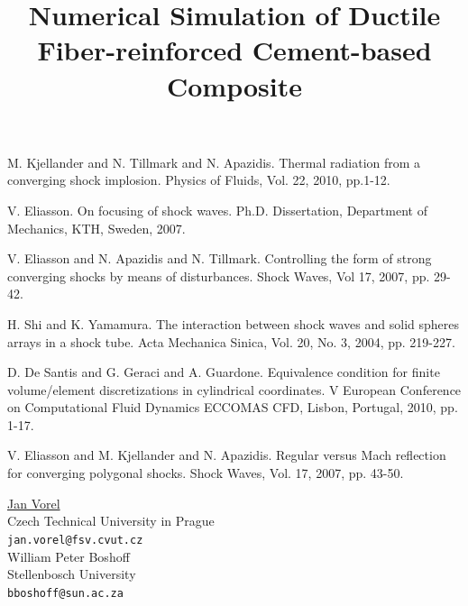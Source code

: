 \documentclass[article,A4,11pt]{llncs}%
\begin{document}

\begin{thebibliography}{10}
{\sc M. Kjellander and N. Tillmark and N. Apazidis}. {Thermal radiation from a converging shock implosion}. Physics of Fluids, Vol. 22, 2010, pp.1-12.

{\sc V. Eliasson}. {On focusing of shock waves}. Ph.D. Dissertation, Department of Mechanics, KTH, Sweden, 2007.

{\sc V. Eliasson and N. Apazidis and N. Tillmark}. {Controlling the form of strong converging shocks by means of disturbances}. Shock Waves, Vol 17, 2007, pp. 29-42.

{\sc H. Shi and K. Yamamura}. {The interaction between shock waves and solid spheres arrays in a shock tube}. Acta Mechanica Sinica, Vol. 20, No. 3, 2004, pp. 219-227.

{\sc D. De Santis and G. Geraci and A. Guardone}. {Equivalence condition for finite volume/element discretizations in cylindrical coordinates}. V European Conference on Computational Fluid Dynamics ECCOMAS CFD, Lisbon, Portugal, 2010, pp. 1-17.

{\sc V. Eliasson and M. Kjellander and N. Apazidis}. {Regular versus Mach reflection for converging polygonal shocks}. Shock Waves, Vol. 17, 2007, pp. 43-50.
\end{thebibliography}

\title{Numerical Simulation of Ductile Fiber-reinforced Cement-based Composite}
 \author{} \institute{}
\maketitle
\begin{center}
{\large \underline{Jan Vorel}}\\
Czech Technical University in Prague\\
{\tt jan.vorel@fsv.cvut.cz}
\\ \vspace{4mm}
{\large William Peter Boshoff}\\
Stellenbosch University\\
{\tt bboshoff@sun.ac.za}
\end{center}
\end{document}
